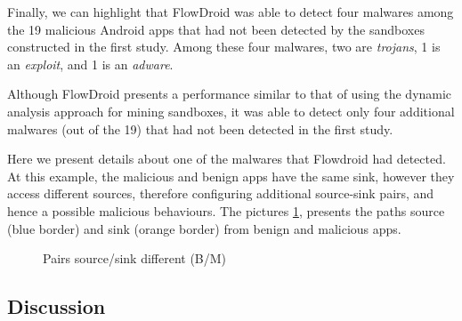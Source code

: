 Finally, we can highlight that FlowDroid was able to detect four malwares among the 19 malicious Android apps that had not
been detected by the sandboxes constructed in the first study. Among these
four malwares, two are \emph{trojans}, 1 is an \emph{exploit}, and 1
is an \emph{adware}.

\begin{finding}
  Although FlowDroid presents a performance similar
  to that of using the dynamic analysis approach for mining sandboxes,
  it was able to detect only four additional malwares (out of the
  19) that had not been detected in the first study. 
\end{finding}

Here we present details about one of the malwares that Flowdroid had detected. At this example, the malicious and benign apps have the same sink, however they access different sources, therefore configuring additional source-sink pairs, and hence a possible malicious behaviours. The pictures \ref{fig:sourcesink}, presents the paths source (blue border) and sink (orange border) from benign and malicious apps.

\begin{figure}[h]%
    \centering
    \qquad
    \caption{Pairs source/sink different (B/M)}%
    \label{fig:sourcesink}%
\end{figure}

\subsection{Discussion}\label{sec:discussion}

